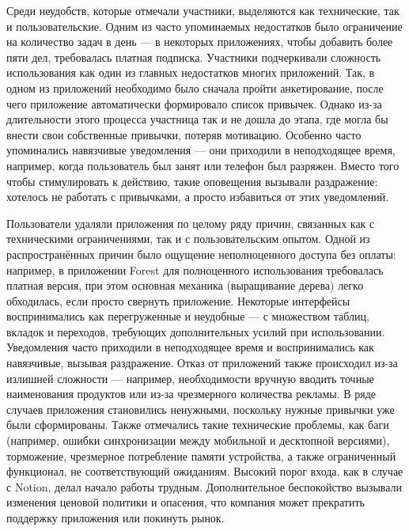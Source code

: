 \documentclass[pdflatex,sn-mathphys-num]{sn-jnl}%
\theoremstyle{thmstyleone}%
\theoremstyle{thmstyletwo}%
\theoremstyle{thmstylethree}%
\begin{document}
Среди неудобств, которые отмечали участники, выделяются как технические, так и пользовательские. Одним из часто упоминаемых недостатков было ограничение на количество задач в день — в некоторых приложениях, чтобы добавить более пяти дел, требовалась платная подписка. Участники подчеркивали сложность использования как один из главных недостатков многих приложений. Так, в одном из приложений необходимо было сначала пройти анкетирование, после чего приложение автоматически формировало список привычек. Однако из-за длительности этого процесса участница так и не дошла до этапа, где могла бы внести свои собственные привычки, потеряв мотивацию. Особенно часто упоминались навязчивые уведомления — они приходили в неподходящее время, например, когда пользователь был занят или телефон был разряжен. Вместо того чтобы стимулировать к действию, такие оповещения вызывали раздражение: хотелось не работать с привычками, а просто избавиться от этих уведомлений.

Пользователи удаляли приложения по целому ряду причин, связанных как с техническими ограничениями, так и с пользовательским опытом. Одной из распространённых причин было ощущение неполноценного доступа без оплаты: например, в приложении Forest для полноценного использования требовалась платная версия, при этом основная механика (выращивание дерева) легко обходилась, если просто свернуть приложение. Некоторые интерфейсы воспринимались как перегруженные и неудобные — с множеством таблиц, вкладок и переходов, требующих дополнительных усилий при использовании. Уведомления часто приходили в неподходящее время и воспринимались как навязчивые, вызывая раздражение. Отказ от приложений также происходил из-за излишней сложности — например, необходимости вручную вводить точные наименования продуктов или из-за чрезмерного количества рекламы. В ряде случаев приложения становились ненужными, поскольку нужные привычки уже были сформированы. Также отмечались такие технические проблемы, как баги (например, ошибки синхронизации между мобильной и десктопной версиями), торможение, чрезмерное потребление памяти устройства, а также ограниченный функционал, не соответствующий ожиданиям. Высокий порог входа, как в случае с Notion, делал начало работы трудным. Дополнительное беспокойство вызывали изменения ценовой политики и опасения, что компания может прекратить поддержку приложения или покинуть рынок.
\end{document}
